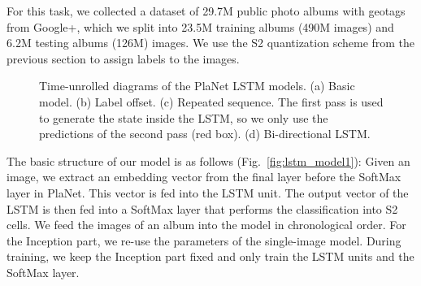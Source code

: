 \documentclass[10pt,twocolumn,letterpaper]{article}
\begin{document}
For this task, we collected a dataset of 29.7M public photo albums
with geotags from Google+, which we split into 23.5M
training albums (490M images) and 6.2M testing albums (126M)
images. We use the S2 quantization scheme from the previous section to
assign labels to the images.

\begin{figure*}[t]
  \centering
{}
  \hspace{8pt}
  \hspace{8pt}
\hspace{8pt}
 \caption{Time-unrolled diagrams of the PlaNet LSTM models. (a)
   Basic model. (b) Label offset. (c) Repeated sequence. The first
   pass is used to generate the state inside the LSTM, so we only use
   the predictions of the second pass (red box). (d) Bi-directional
   LSTM.}
\end{figure*}
The basic structure of our model is as follows
(Fig.~\ref{fig:lstm_model1}): Given an image, we extract an embedding
vector from the final layer before the SoftMax layer in PlaNet.
This vector is fed into the LSTM unit. The output vector of the LSTM
is then fed into a SoftMax layer that performs the classification into
S2 cells. We feed the images of an album into the model in
chronological order. For the Inception part, we re-use the
parameters of the single-image model. During training, we keep the
Inception part fixed and only train the LSTM units and the SoftMax
layer.
\end{document}

